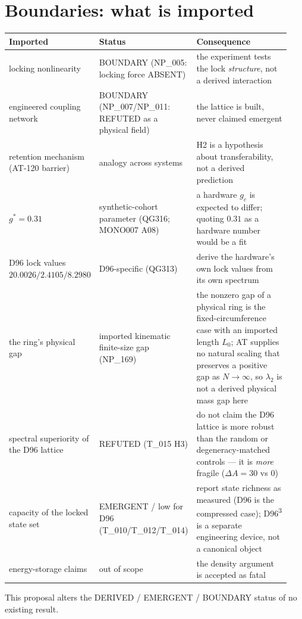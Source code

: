 \documentclass[11pt,a4paper]{article}
\newcommand{\ls}[1]{\ensuremath{\lambda_{#1}}}
\begin{document}
\section{Boundaries: what is imported}

\begin{table}[h]
\centering
\small
\begin{tabular}{@{}p{0.30\linewidth}p{0.30\linewidth}p{0.34\linewidth}@{}}
\toprule
Imported & Status & Consequence \\
\midrule
locking nonlinearity & BOUNDARY (NP\_005: locking force ABSENT) & the experiment tests the lock
\emph{structure}, not a derived interaction \\
engineered coupling network & BOUNDARY (NP\_007/NP\_011: REFUTED as a physical field) & the lattice
is built, never claimed emergent \\
retention mechanism (AT-120 barrier) & analogy across systems & H2 is a hypothesis about
transferability, not a derived prediction \\
$g^\ast=0.31$ & synthetic-cohort parameter (QG316; MONO007 A08) & a hardware $g_c$ is expected to
differ; quoting $0.31$ as a hardware number would be a fit \\
D96 lock values $20.0026/2.4105/8.2980$ & D96-specific (QG313) & derive the hardware's own lock
values from its own spectrum \\
the ring's physical gap & imported kinematic finite-size gap (NP\_169) & the nonzero gap of a
physical ring is the fixed-circumference case with an imported length $L_0$; AT supplies no natural
scaling that preserves a positive gap as $N\to\infty$, so $\ls{2}$ is not a derived physical mass
gap here \\
spectral superiority of the D96 lattice & REFUTED (T\_015 H3) & do not claim the D96 lattice is more
robust than the random or degeneracy-matched controls --- it is \emph{more} fragile
($\Delta A=30$ vs $0$) \\
capacity of the locked state set & EMERGENT / low for D96 (T\_010/T\_012/T\_014) & report state
richness as measured (D96 is the compressed case); D96\textsuperscript{3} is a separate engineering
device, not a canonical object \\
energy-storage claims & out of scope & the density argument is accepted as fatal \\
\bottomrule
\end{tabular}
\end{table}

\noindent This proposal alters the DERIVED / EMERGENT / BOUNDARY status of no existing result.
\end{document}

